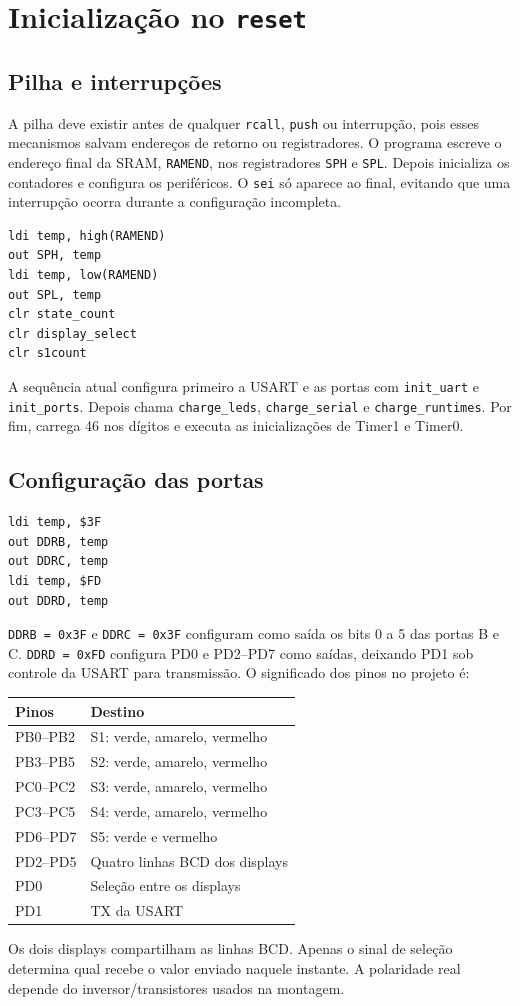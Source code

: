 \documentclass[12pt,a4paper]{article}
\newcommand{\reg}[1]{\texttt{#1}}
\begin{document}
\section{Inicialização no \texttt{reset}}
\subsection{Pilha e interrupções}
A pilha deve existir antes de qualquer \reg{rcall}, \reg{push} ou interrupção, pois esses mecanismos salvam endereços de retorno ou registradores. O programa escreve o endereço final da SRAM, \reg{RAMEND}, nos registradores \reg{SPH} e \reg{SPL}. Depois inicializa os contadores e configura os periféricos. O \reg{sei} só aparece ao final, evitando que uma interrupção ocorra durante a configuração incompleta.
\begin{lstlisting}
ldi temp, high(RAMEND)
out SPH, temp
ldi temp, low(RAMEND)
out SPL, temp
clr state_count
clr display_select
clr s1count
\end{lstlisting}
A sequência atual configura primeiro a USART e as portas com \reg{init\_uart} e \reg{init\_ports}. Depois chama \reg{charge\_leds}, \reg{charge\_serial} e \reg{charge\_runtimes}. Por fim, carrega 46 nos dígitos e executa as inicializações de Timer1 e Timer0.

\subsection{Configuração das portas}
\begin{lstlisting}
ldi temp, $3F
out DDRB, temp
out DDRC, temp
ldi temp, $FD
out DDRD, temp
\end{lstlisting}
\reg{DDRB = 0x3F} e \reg{DDRC = 0x3F} configuram como saída os bits 0 a 5 das portas B e C. \reg{DDRD = 0xFD} configura PD0 e PD2--PD7 como saídas, deixando PD1 sob controle da USART para transmissão. O significado dos pinos no projeto é:
\begin{center}
\begin{tabular}{ll}
\toprule \textbf{Pinos} & \textbf{Destino}\\ \midrule
PB0--PB2 & S1: verde, amarelo, vermelho\\
PB3--PB5 & S2: verde, amarelo, vermelho\\
PC0--PC2 & S3: verde, amarelo, vermelho\\
PC3--PC5 & S4: verde, amarelo, vermelho\\
PD6--PD7 & S5: verde e vermelho\\
PD2--PD5 & Quatro linhas BCD dos displays\\
PD0 & Seleção entre os displays\\
PD1 & TX da USART\\ \bottomrule
\end{tabular}
\end{center}
Os dois displays compartilham as linhas BCD. Apenas o sinal de seleção determina qual recebe o valor enviado naquele instante. A polaridade real depende do inversor/transistores usados na montagem.
\end{document}
